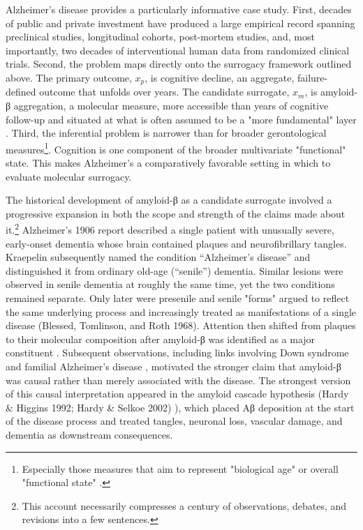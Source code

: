 \documentclass[twocolumn]{article} %
\begin{document}
Alzheimer’s disease provides a particularly informative case study. First, decades of public and private investment have produced a large empirical record spanning preclinical studies, longitudinal cohorts, post-mortem studies, and, most importantly, two decades of interventional human data from randomized clinical trials. Second, the problem maps directly onto the surrogacy framework outlined above. The primary outcome, $x_p$, is cognitive decline, an aggregate, failure-defined outcome that unfolds over years. The candidate surrogate, $x_m$, is amyloid-β aggregation, a molecular measure, more accessible than years of cognitive follow-up and situated at what is often assumed to be a "more fundamental" layer \cite{fda_surrogate_endpoints}. Third, the inferential problem is narrower than for broader gerontological measures\footnote{Especially those measures that aim to represent "biological age" or overall "functional state" \cite{vera2025multiomic}\citep[a]{waziry2023effect}\cite{hu2025house}.}. Cognition is one component of the broader multivariate "functional" state. This makes Alzheimer's a comparatively favorable setting in which to evaluate molecular surrogacy.


The historical development of amyloid-β as a candidate surrogate involved a progressive expansion in both the scope and strength of the claims made about it.\footnote{This account necessarily compresses a century of observations, debates, and revisions into a few sentences.} Alzheimer’s 1906 report described a single patient with unusually severe, early-onset dementia whose brain contained plaques and neurofibrillary tangles. Kraepelin subsequently named the condition “Alzheimer’s disease” and distinguished it from ordinary old-age (“senile”) dementia. Similar lesions were observed in senile dementia at roughly the same time, yet the two conditions remained separate. Only later were presenile and senile "forms" argued to reflect the same underlying process and increasingly treated as manifestations of a single disease (Blessed, Tomlinson, and Roth 1968). Attention then shifted from plaques to their molecular composition after amyloid-β was identified as a major constituent \citep[a]{hardy2002amyloid}\citep[a]{salloway2014two}. Subsequent observations, including links involving Down syndrome and familial Alzheimer’s disease \citep[d]{hardy2002amyloid}, motivated the stronger claim that amyloid-β was causal rather than merely associated with the disease. The strongest version of this causal interpretation appeared in the amyloid cascade hypothesis (Hardy \& Higgins 1992; Hardy \& Selkoe 2002) \citep[a]{hardy1992alzheimer}), which placed Aβ deposition at the start of the disease process and treated tangles, neuronal loss, vascular damage, and dementia as downstream consequences.
\end{document}
